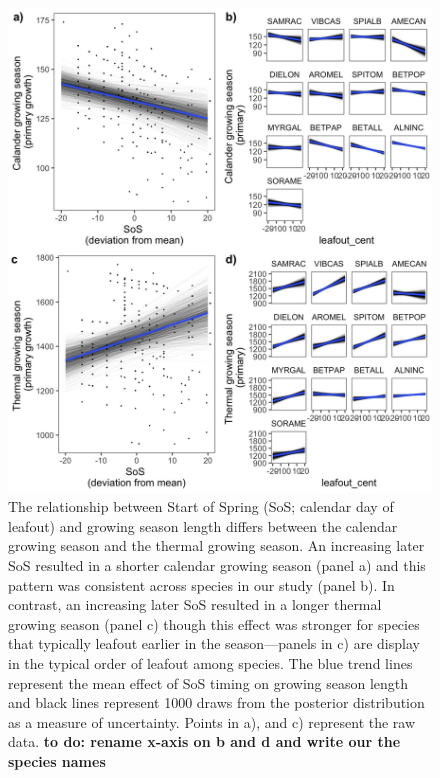 \documentclass[12 pt]{article}
\begin{document}
\begin{figure}[h!]
    \centering
 \includegraphics[width=.7\textwidth]{..//analyses/figures/primarygrowingseason_modplots.jpeg}
    \caption{The relationship between Start of Spring (SoS; calendar day of leafout) and growing season length differs between the calendar growing season and the thermal growing season. An increasing later SoS resulted in a shorter calendar growing season (panel a) and this pattern was consistent across species in our study (panel b). In contrast, an increasing later SoS resulted in a longer thermal growing season (panel c) though this effect was stronger for species that typically leafout earlier in the season---panels in c) are display in the typical order of leafout among species. The blue trend lines represent the mean effect of SoS timing on growing season length and black lines represent 1000 draws from the posterior distribution as a measure of uncertainty. Points in a), and c) represent the raw data. \textbf{to do: rename x-axis on b and d and write our the species names}}
    \label{fig:thermcal}
\end{figure}
\end{document}

